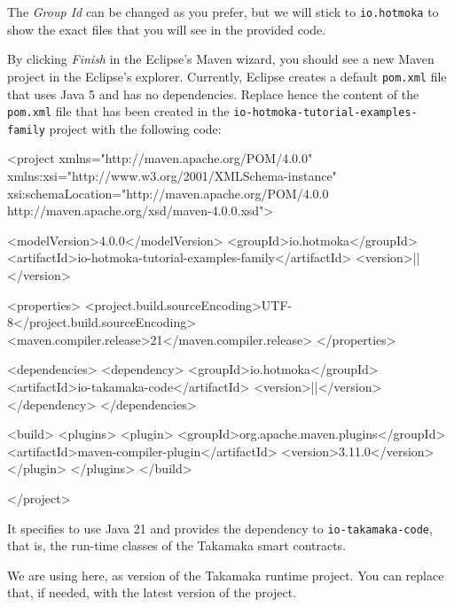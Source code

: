 \begin{commentbox}
The \emph{Group Id} can be changed as you prefer, but we will stick
to \texttt{io.hotmoka} to show the exact files that you will see in the provided code.
\end{commentbox}

By clicking \emph{Finish} in the Eclipse's Maven wizard, you should see
a new Maven project in the Eclipse's explorer.
Currently, Eclipse creates a default \texttt{pom.xml} file that uses Java 5
and has no dependencies. Replace hence
the content of the \texttt{pom.xml} file that has been created in the
\texttt{io-hotmoka-tutorial-examples-family} project with the following code:
%
\begin{codebox}\begin{xmllst}
<project xmlns="http://maven.apache.org/POM/4.0.0"
    xmlns:xsi="http://www.w3.org/2001/XMLSchema-instance"
    xsi:schemaLocation="http://maven.apache.org/POM/4.0.0 http://maven.apache.org/xsd/maven-4.0.0.xsd">

  <modelVersion>4.0.0</modelVersion>
  <groupId>io.hotmoka</groupId>
  <artifactId>io-hotmoka-tutorial-examples-family</artifactId>
  <version>|\hotmokaVersion{}|</version>

  <properties>
    <project.build.sourceEncoding>UTF-8</project.build.sourceEncoding>
    <maven.compiler.release>21</maven.compiler.release>
  </properties>

  <dependencies>
    <dependency>
      <groupId>io.hotmoka</groupId>
      <artifactId>io-takamaka-code</artifactId>
      <version>|\takamakaVersion{}|</version>
    </dependency>
  </dependencies>

  <build>
    <plugins>
      <plugin>
        <groupId>org.apache.maven.plugins</groupId>
        <artifactId>maven-compiler-plugin</artifactId>
        <version>3.11.0</version>
      </plugin>
    </plugins>
  </build>

</project>
\end{xmllst}\end{codebox}
%
It specifies to use Java 21 and provides the dependency
to \texttt{io-takamaka-code}, that is, the run-time classes of the Takamaka smart contracts.

\begin{commentbox}
We are using \takamakaVersion{} here, as version of the Takamaka runtime
project. You can replace that, if needed, with the latest version of the project.
\end{commentbox}

